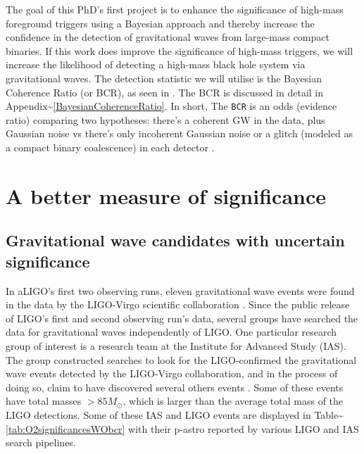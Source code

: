 \documentclass[%
 reprint,
 amsmath,amssymb,
 aps,
]{revtex4}
\begin{document}
The goal of this PhD's first project is to enhance the significance of high-mass foreground triggers using a Bayesian
approach and thereby increase the confidence in the detection of gravitational waves from large-mass compact binaries.
If this work does improve the significance of high-mass triggers, we will increase the likelihood of detecting a
high-mass black hole system via gravitational waves. The detection statistic we will utilise is the Bayesian Coherence
Ratio (or BCR), as seen in \citet{bcr_paper}. The BCR is discussed in detail in Appendix\textasciitilde\ref{BayesianCoherenceRatio}. In
short, The \texttt{BCR} is an odds (evidence ratio) comparing two hypotheses: there's a coherent GW in the data, plus Gaussian
noise vs there's only incoherent Gaussian noise or a glitch (modeled as a compact binary coalescence) in each detector
\citep{bcr_paper}.

\hypertarget{a-better-measure-of-significance}{%
\section{A better measure of significance}\label{a-better-measure-of-significance}}

\hypertarget{gravitational-wave-candidates-with-uncertain-significance}{%
\subsection{Gravitational wave candidates with uncertain significance}\label{gravitational-wave-candidates-with-uncertain-significance}}

In aLIGO's first two observing runs, eleven gravitational wave events were found in the data by the LIGO-Virgo
scientific collaboration \citep{abbott2019gwtc}. Since the public release of LIGO's first and second observing run's data,
several groups have searched the data for gravitational waves independently of LIGO. One particular research group of
interest is a research team at the Institute for Advanced Study (IAS). The group constructed searches to look for the
LIGO-confirmed the gravitational wave events detected by the LIGO-Virgo collaboration, and in the process of doing so,
claim to have discovered several others events \citep{IAS0, IAS1, IAS2}. Some of these events have total masses \(>85 M_{\odot}\), which is larger than the average total mass of the LIGO detections. Some of these IAS and LIGO events are
displayed in Table\textasciitilde\ref{tab:O2significancesWObcr} with their p-astro reported by various LIGO and IAS search pipelines.
\end{document}
